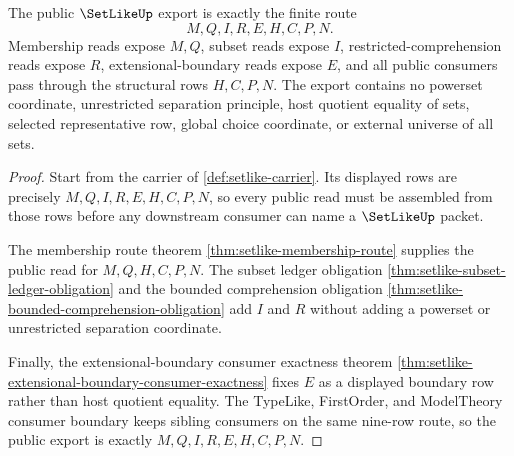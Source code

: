 \begin{theorem}
\label{thm:setlike-public-namecert-export}
The public $\SetLikeUp$ export is exactly the finite route
$$
M,Q,I,R,E,H,C,P,N .
$$
Membership reads expose $M,Q$, subset reads expose $I$, restricted-comprehension reads expose $R$, extensional-boundary reads expose $E$, and all public consumers pass through the structural rows $H,C,P,N$. The export contains no powerset coordinate, unrestricted separation principle, host quotient equality of sets, selected representative row, global choice coordinate, or external universe of all sets.
\end{theorem}
\begin{proof}
Start from the carrier of \autoref{def:setlike-carrier}. Its displayed rows are precisely $M,Q,I,R,E,H,C,P,N$, so every public read must be assembled from those rows before any downstream consumer can name a $\SetLikeUp$ packet.

The membership route theorem \autoref{thm:setlike-membership-route} supplies the public read for $M,Q,H,C,P,N$. The subset ledger obligation \autoref{thm:setlike-subset-ledger-obligation} and the bounded comprehension obligation \autoref{thm:setlike-bounded-comprehension-obligation} add $I$ and $R$ without adding a powerset or unrestricted separation coordinate.

Finally, the extensional-boundary consumer exactness theorem \autoref{thm:setlike-extensional-boundary-consumer-exactness} fixes $E$ as a displayed boundary row rather than host quotient equality. The TypeLike, FirstOrder, and ModelTheory consumer boundary keeps sibling consumers on the same nine-row route, so the public export is exactly $M,Q,I,R,E,H,C,P,N$.
\end{proof}


\begin{closurestatus}{\SetLikeUp}
  \theoryclosure{\matureClosure}
  \formalstatus{\unformalizedV}
\end{closurestatus}
